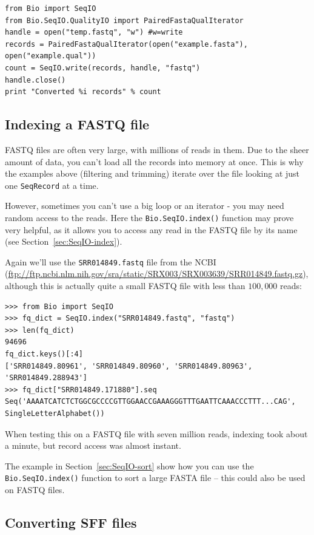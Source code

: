 \documentclass{report}
\begin{document}
\begin{verbatim}
from Bio import SeqIO
from Bio.SeqIO.QualityIO import PairedFastaQualIterator
handle = open("temp.fastq", "w") #w=write
records = PairedFastaQualIterator(open("example.fasta"), open("example.qual"))
count = SeqIO.write(records, handle, "fastq")
handle.close()
print "Converted %i records" % count
\end{verbatim}

\subsection{Indexing a FASTQ file}
\label{sec:fastq-indexing}

FASTQ files are often very large, with millions of reads in them. Due to the
sheer amount of data, you can't load all the records into memory at once.
This is why the examples above (filtering and trimming) iterate over the file
looking at just one \verb|SeqRecord| at a time.

However, sometimes you can't use a big loop or an iterator - you may need
random access to the reads. Here the \verb|Bio.SeqIO.index()| function
may prove very helpful, as it allows you to access any read in the FASTQ file
by its name (see Section~\ref{sec:SeqIO-index}).

Again we'll use the \texttt{SRR014849.fastq} file from the NCBI
(\url{ftp://ftp.ncbi.nlm.nih.gov/sra/static/SRX003/SRX003639/SRR014849.fastq.gz}),
although this is actually quite a small FASTQ file with less than $100,000$ reads:

\begin{verbatim}
>>> from Bio import SeqIO
>>> fq_dict = SeqIO.index("SRR014849.fastq", "fastq")
>>> len(fq_dict)
94696
fq_dict.keys()[:4]
['SRR014849.80961', 'SRR014849.80960', 'SRR014849.80963', 'SRR014849.288943']
>>> fq_dict["SRR014849.171880"].seq
Seq('AAAATCATCTCTGGCGCCCCGTTGGAACCGAAAGGGTTTGAATTCAAACCCTTT...CAG', SingleLetterAlphabet())
\end{verbatim}

When testing this on a FASTQ file with seven million reads,
indexing took about a minute, but record access was almost instant.

The example in Section~\ref{sec:SeqIO-sort} show how you can use the
\verb|Bio.SeqIO.index()| function to sort a large FASTA file -- this
could also be used on FASTQ files.

\subsection{Converting SFF files}
\label{sec:SeqIO-sff-conversion}
\end{document}
